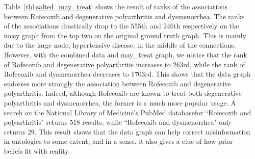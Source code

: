 Table~\ref{tbl:salted_may_treat} shows the result of ranks of the associations between Rofecoxib and degenerative polyarthritis and dysmenorrhea. The ranks of the associations drastically drop to the 555th and 246th respectively on the noisy graph from the top two on the original ground truth graph. This is mainly due to the large node, hypertensive disease, in the middle of the connections. However, with the combined data and may\_treat graph, we notice that the rank of Rofecoxib and degenerative polyarthritis increases to 263rd, while the rank of Rofecoxib and  dysmenorrhea decreases to 1703rd. This shows that the data graph endorses more strongly the association between Rofecoxib and degenerative polyarthritis. Indeed, although Rofecoxib are known to treat both degenerative polyarthritis and dysmenorrhea, the former is a much more popular usage. A search on the National Library of Medicine's PubMed database\footnotemark[1] for ``Rofecoxib and polyarthritis" returns 518 results, while ``Rofecoxib and dysmenorrhea" only returns 29. This result shows that the data graph can help correct misinformation in ontologies to some extent, and in a sense, it also gives a clue of how prior beliefs fit with reality.


